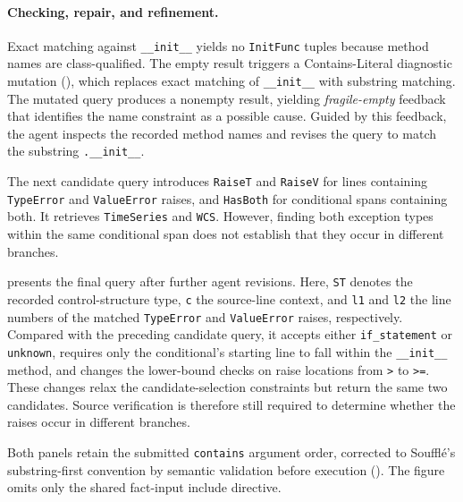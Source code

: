 \paragraph*{Checking, repair, and refinement.}
Exact matching against \texttt{\_\_init\_\_} yields no \texttt{InitFunc} tuples because method names are class-qualified. The empty result triggers a Contains-Literal diagnostic mutation (), which replaces exact matching of \texttt{\_\_init\_\_} with substring matching. The mutated query produces a nonempty result, yielding \emph{fragile-empty} feedback that identifies the name constraint as a possible cause. Guided by this feedback, the agent inspects the recorded method names and revises the query to match the substring \texttt{.\_\_init\_\_}.

The next candidate query introduces \texttt{RaiseT} and \texttt{RaiseV} for lines containing \texttt{TypeError} and \texttt{ValueError} raises, and \texttt{HasBoth} for conditional spans containing both. It retrieves \texttt{TimeSeries} and \texttt{WCS}. However, finding both exception types within the same conditional span does not establish that they occur in different branches.

 presents the final query after further agent revisions. Here, \texttt{ST} denotes the recorded control-structure type, \texttt{c} the source-line context, and \texttt{l1} and \texttt{l2} the line numbers of the matched \texttt{TypeError} and \texttt{ValueError} raises, respectively. Compared with the preceding candidate query, it accepts either \texttt{if\_statement} or \texttt{unknown}, requires only the conditional's starting line to fall within the \texttt{\_\_init\_\_} method, and changes the lower-bound checks on raise locations from \texttt{>} to \texttt{>=}. These changes relax the candidate-selection constraints but return the same two candidates. Source verification is therefore still required to determine whether the raises occur in different branches.

Both panels retain the submitted \texttt{contains} argument order, corrected to Souffl\'e's substring-first convention by semantic validation before execution (). The figure omits only the shared fact-input include directive.

